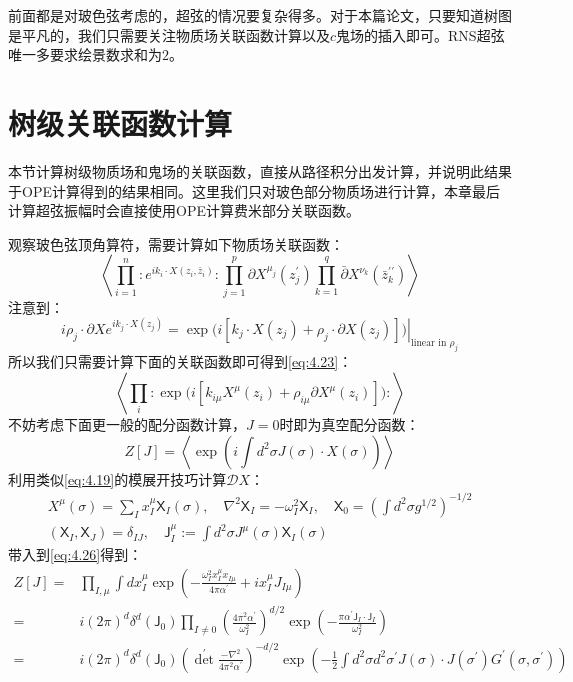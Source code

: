 前面都是对玻色弦考虑的，超弦的情况要复杂得多。对于本篇论文，只要知道树图是平凡的，我们只需要关注物质场关联函数计算以及$c$鬼场的插入即可。RNS超弦唯一多要求绘景数求和为$2$。
\section{树级关联函数计算}
本节计算树级物质场和鬼场的关联函数，直接从路径积分出发计算，并说明此结果于OPE计算得到的结果相同。这里我们只对玻色部分物质场进行计算，本章最后计算超弦振幅时会直接使用OPE计算费米部分关联函数。

观察玻色弦顶角算符，需要计算如下物质场关联函数：
\begin{equation}
	\label{eq:4.23}
	\left\langle\prod_{i=1}^n:e^{ik_i\cdot X(z_i,\bar{z}_i)}:\prod_{j=1}^p\partial X^{\mu_j}(z_j^{\prime})\prod_{k=1}^q\bar{\partial}X^{\nu_k}(\bar{z}_k^{\prime\prime})\right\rangle
\end{equation}
注意到：
\begin{equation}
	\label{eq:4.24}
	i\rho_j\cdot\partial Xe^{ik_j\cdot X(z_j)}=\left.\exp\bigg(i[k_j\cdot X(z_j)+\rho_j\cdot\partial X(z_j)]\bigg)\right|_{\text{linear in }\rho_j}
\end{equation}
所以我们只需要计算下面的关联函数即可得到\ref{eq:4.23}：
\begin{equation}
	\label{eq:4.25}
	\left\langle\prod_i:\exp\bigg(i\left[k_{i\mu}X^\mu(z_i)+\rho_{i\mu}\partial X^\mu(z_i)\right]\bigg):\right\rangle
\end{equation}
不妨考虑下面更一般的配分函数计算，$J=0$时即为真空配分函数：
\begin{equation}
	\label{eq:4.26}
	Z\left[J\right]=\left\langle\exp\left(i\int d^2\sigma J(\sigma)\cdot X(\sigma)\right)\right\rangle
\end{equation}
利用类似\ref{eq:4.19}的模展开技巧计算$\mathcal{D}X$：
\begin{equation}
	\begin{gathered}
		X^\mu(\sigma)=\sum_Ix_I^\mu\mathsf{X}_I(\sigma),\quad\nabla^2\mathsf{X}_I=-\omega_I^2\mathsf{X}_I,\quad \mathsf{X}_0=\left(\int d^2\sigma g^{1/2}\right)^{-1/2}\\ \left(\mathsf{X}_I,\mathsf{X}_J\right)=\delta_{IJ},\quad
	\mathsf{J}_I^\mu:=\int d^2\sigma J^\mu(\sigma)\mathsf{X}_I(\sigma)
	\end{gathered}
\end{equation}
带入到\ref{eq:4.26}得到：
\begin{equation}
	\label{eq:4.28}
\begin{aligned}
		Z\left[J\right]=&\prod_{I,\mu}\int dx_I^\mu\exp\left(-\frac{\omega_I^2x_I^\mu x_{I\mu}}{4\pi\alpha^{\prime}}+ix_I^\mu J_{I\mu}\right)\\
	=&i(2\pi)^d\delta^d(\mathsf{J}_0)\prod_{I\neq0}\left(\frac{4\pi^2\alpha^{\prime}}{\omega_I^2}\right)^{d/2}\exp\left(-\frac{\pi\alpha^{\prime}\mathsf{J}_I\cdot \mathsf{J}_I}{\omega_I^2}\right)\\
	=&i(2\pi)^d\delta^d(\mathsf{J}_0)\left({\det}^{\prime}\frac{-\nabla^2}{4\pi^2\alpha^{\prime}}\right)^{-d/2}\exp\left(-\frac{1}{2}\int d^2\sigma d^2\sigma^{\prime}J(\sigma)\cdot J(\sigma^{\prime})G^{\prime}(\sigma,\sigma^{\prime})\right)
\end{aligned}
\end{equation}
